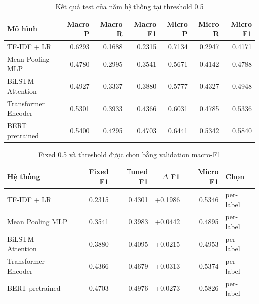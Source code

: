 \begin{table}[H]
\centering
\small
\setlength{\tabcolsep}{3.5pt}
\begin{tabular}{lrrrrrr}
\toprule
\textbf{Mô hình} & \textbf{Macro P} & \textbf{Macro R} & \textbf{Macro F1} & \textbf{Micro P} & \textbf{Micro R} & \textbf{Micro F1} \\
\midrule
TF-IDF + LR & 0.6293 & 0.1688 & 0.2315 & 0.7134 & 0.2947 & 0.4171 \\
Mean Pooling MLP & 0.4780 & 0.2995 & 0.3541 & 0.5671 & 0.4142 & 0.4788 \\
BiLSTM + Attention & 0.4927 & 0.3337 & 0.3880 & 0.5777 & 0.4327 & 0.4948 \\
Transformer Encoder & 0.5301 & 0.3933 & 0.4366 & 0.6031 & 0.4785 & 0.5336 \\
BERT pretrained & 0.5400 & 0.4295 & 0.4703 & 0.6441 & 0.5342 & 0.5840 \\
\bottomrule
\end{tabular}
\caption{Kết quả test của năm hệ thống tại threshold 0.5}
\label{tab:model-results}
\end{table}

\begin{table}[H]
\centering
\small
\setlength{\tabcolsep}{4pt}
\begin{tabular}{lrrrrl}
\toprule
\textbf{Hệ thống} & \textbf{Fixed F1} & \textbf{Tuned F1} & \textbf{$\Delta$ F1} & \textbf{Micro F1} & \textbf{Chọn} \\
\midrule
TF-IDF + LR & 0.2315 & 0.4301 & +0.1986 & 0.5346 & per-label \\
Mean Pooling MLP & 0.3541 & 0.3983 & +0.0442 & 0.4895 & per-label \\
BiLSTM + Attention & 0.3880 & 0.4095 & +0.0215 & 0.4953 & per-label \\
Transformer Encoder & 0.4366 & 0.4679 & +0.0313 & 0.5374 & per-label \\
BERT pretrained & 0.4703 & 0.4976 & +0.0273 & 0.5826 & per-label \\
\bottomrule
\end{tabular}
\caption{Fixed 0.5 và threshold được chọn bằng validation macro-F1}
\label{tab:threshold-results}
\end{table}
